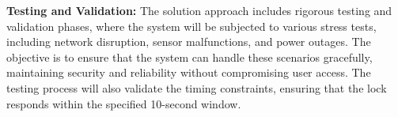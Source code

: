 \textbf{Testing and Validation:}
The solution approach includes rigorous testing and validation phases, where the system will be subjected to various stress tests, including network disruption, sensor malfunctions, and power outages. The objective is to ensure that the system can handle these scenarios gracefully, maintaining security and reliability without compromising user access. The testing process will also validate the timing constraints, ensuring that the lock responds within the specified 10-second window.

